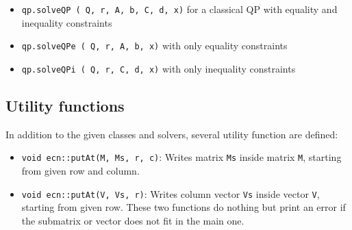 \documentclass{ecnreport}
\begin{document}
\begin{itemize}
 \item \texttt{qp.solveQP ( Q, r, A, b, C, d, x)} for a classical QP with equality and inequality constraints
 \item  \texttt{qp.solveQPe ( Q, r, A, b, x)} with only equality constraints
 \item  \texttt{qp.solveQPi ( Q, r, C, d, x)} with only inequality constraints
\end{itemize}


\subsection{Utility functions}

In addition to the given classes and solvers, several utility function are defined:
\begin{itemize}
 \item \texttt{void ecn::putAt(M, Ms, r, c)}: Writes matrix \texttt{Ms} inside matrix \texttt{M}, starting from given row and column.
 \item \texttt{void ecn::putAt(V, Vs, r)}: Writes column vector \texttt{Vs} inside vector \texttt{V}, starting from given row. These two functions do nothing but print an error
 if the submatrix or vector does not fit in the main one.
\end{itemize}
\end{document}
